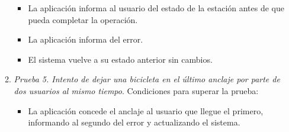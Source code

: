 \begin{itemize}
\begin{enumerate}
\begin{itemize}
			\item La aplicación informa al usuario del estado de la estación antes de que pueda completar la operación.
			\item La aplicación informa del error.
			\item El sistema vuelve a su estado anterior sin cambios.
		\end{itemize}
		\item \textit{Prueba 5. Intento de dejar una bicicleta en el último anclaje por parte de dos usuarios al mismo tiempo}. Condiciones para superar la prueba:
		\begin{itemize}
			\item La aplicación concede el anclaje al usuario que llegue el primero, informando al segundo del error y actualizando el sistema.
		\end{itemize}
	\end{enumerate}
	

\end{itemize}
